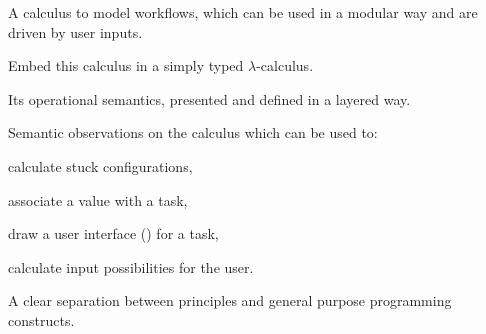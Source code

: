 \begin{itemize*}
  \item A calculus to model workflows, which can be used in a modular way and are driven by user inputs.\\
  \item Embed this calculus in a simply typed $\lambda$-calculus.\\
  \item Its operational semantics, presented and defined in a layered way.\\
  \item Semantic observations on the calculus which can be used to:\\
  \begin{itemize*}
    \item calculate stuck configurations,\\
    \item associate a value with a task,\\
    \item draw a user interface (\UI) for a task,\\
    \item calculate input possibilities for the user.\\
  \end{itemize*}
  \item A clear separation between \TOP principles and general purpose programming constructs.\\
\end{itemize*}
